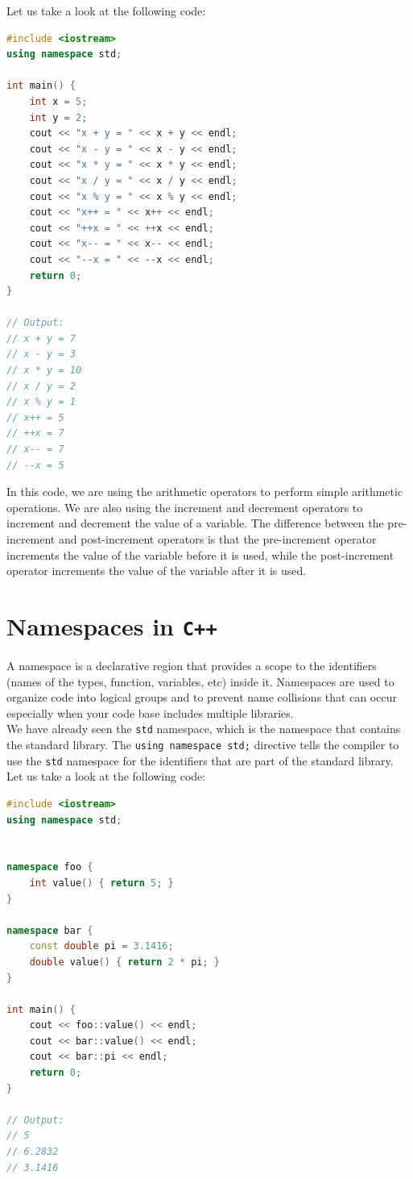 Let us take a look at the following code:

\begin{lstlisting}[language=C++]
#include <iostream>
using namespace std;

int main() {
    int x = 5;
    int y = 2;
    cout << "x + y = " << x + y << endl;
    cout << "x - y = " << x - y << endl;
    cout << "x * y = " << x * y << endl;
    cout << "x / y = " << x / y << endl;
    cout << "x % y = " << x % y << endl;
    cout << "x++ = " << x++ << endl;
    cout << "++x = " << ++x << endl;
    cout << "x-- = " << x-- << endl;
    cout << "--x = " << --x << endl;
    return 0;
}

// Output:
// x + y = 7
// x - y = 3
// x * y = 10
// x / y = 2
// x % y = 1
// x++ = 5
// ++x = 7
// x-- = 7
// --x = 5
\end{lstlisting}

In this code, we are using the arithmetic operators to perform simple arithmetic operations. We are also
using the increment and decrement operators to increment and decrement the value of a variable. The difference
between the pre-increment and post-increment operators is that the pre-increment operator increments the value
of the variable before it is used, while the post-increment operator increments the value of the variable after
it is used.\\

\section{Namespaces in \texttt{C++}}

A namespace is a declarative region that provides a scope to the identifiers (names of the types, function,
variables, etc) inside it. Namespaces are used to organize code into logical groups and to prevent name
collisions that can occur especially when your code base includes multiple libraries.\\

We have already seen the \texttt{std} namespace, which is the namespace that contains the standard library.
The \texttt{using namespace std;} directive tells the compiler to use the \texttt{std} namespace for the
identifiers that are part of the standard library.\\

Let us take a look at the following code:

\begin{lstlisting}[language=C++]
#include <iostream>
using namespace std;


namespace foo {
    int value() { return 5; }
}

namespace bar {
    const double pi = 3.1416;
    double value() { return 2 * pi; }
}

int main() {
    cout << foo::value() << endl;
    cout << bar::value() << endl;
    cout << bar::pi << endl;
    return 0;
}

// Output:
// 5
// 6.2832
// 3.1416
\end{lstlisting}

